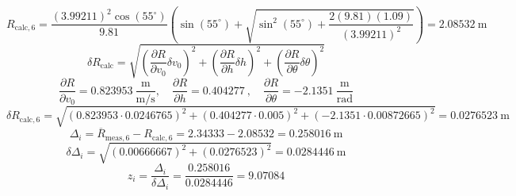 \documentclass[11pt]{article}
\begin{document}
\[
R_{\mathrm{calc},6} = \frac{(3.99211)^2\cos(55^\circ)}{9.81}\left(\sin(55^\circ) + \sqrt{\sin^2(55^\circ) + \frac{2(9.81)(1.09)}{(3.99211)^2}}\right) = 2.08532\ \mathrm{m}
\]
\[
\delta R_{\mathrm{calc}} = \sqrt{\left(\frac{\partial R}{\partial v_0}\delta v_0\right)^2 + \left(\frac{\partial R}{\partial h}\delta h\right)^2 + \left(\frac{\partial R}{\partial \theta}\delta \theta\right)^2}
\]
\[
\frac{\partial R}{\partial v_0} = 0.823953\ \frac{\mathrm{m}}{\mathrm{m/s}},\quad \frac{\partial R}{\partial h} = 0.404277\ ,\quad \frac{\partial R}{\partial \theta} = -2.1351\ \frac{\mathrm{m}}{\mathrm{rad}}
\]
\[
\delta R_{\mathrm{calc},6} = \sqrt{(0.823953\cdot 0.0246765)^2 + (0.404277\cdot 0.005)^2 + (-2.1351\cdot 0.00872665)^2} = 0.0276523\ \mathrm{m}
\]
\[
\Delta_i = \overline{R}_{\mathrm{meas},6} - R_{\mathrm{calc},6} = 2.34333 - 2.08532 = 0.258016\ \mathrm{m}
\]
\[
\delta \Delta_i = \sqrt{(0.00666667)^2 + (0.0276523)^2} = 0.0284446\ \mathrm{m}
\]
\[
z_i = \frac{\Delta_i}{\delta \Delta_i} = \frac{0.258016}{0.0284446} = 9.07084
\]
\end{document}
